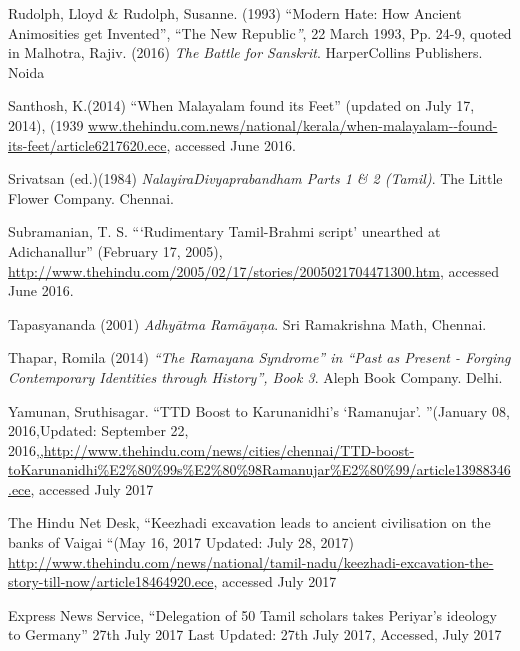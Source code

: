 \begin{thebibliography}{99}
  Rudolph, Lloyd \& Rudolph, Susanne. (1993) “Modern Hate: How Ancient Animosities get Invented”, “The New Republic\textit{”}, 22 March 1993, Pp. 24-9, quoted in Malhotra, Rajiv. (2016) \textit{The Battle for Sanskrit}. HarperCollins Publishers. Noida

  Santhosh, K.(2014) “When Malayalam found its Feet” (updated on July 17, 2014), (1939 \url{www.thehindu.com.news/national/kerala/when-malayalam--found-its-feet/article6217620.ece}, accessed June 2016.

  Srivatsan (ed.)(1984) \textit{NalayiraDivyaprabandham Parts 1 \& 2 (Tamil)}. The Little Flower Company. Chennai.

  Subramanian, T. S. “‘Rudimentary Tamil-Brahmi script' unearthed at Adichanallur” (February 17, 2005), \url{http://www.thehindu.com/2005/02/17/stories/2005021704471300.htm}, accessed June 2016.

  Tapasyananda (2001) \textit{Adhyātma Ramāyaņa}. Sri Ramakrishna Math, Chennai.

  Thapar, Romila (2014) \textit{“The Ramayana Syndrome” in “Past as Present - Forging} \textit{Contemporary Identities through History”, Book 3}. Aleph Book Company. Delhi.

  Yamunan, Sruthisagar. “TTD Boost to Karunanidhi’s ‘Ramanujar’. ”(January 08, 2016,Updated: September 22, 2016,\url{,http://www.thehindu.com/news/cities/chennai/TTD-boost-toKarunanidhi%E2%80%99s%E2%80%98Ramanujar%E2%80%99/article13988346.ece}, accessed July 2017

  The Hindu Net Desk, “Keezhadi excavation leads to ancient civilisation on the banks of Vaigai “(May 16, 2017 Updated: July 28, 2017) \url{http://www.thehindu.com/news/national/tamil-nadu/keezhadi-excavation-the-story-till-now/article18464920.ece}, accessed July 2017

  Express News Service, “Delegation of 50 Tamil scholars takes Periyar’s ideology to Germany” 27th July 2017 Last Updated: 27th July 2017, Accessed, July 2017

 \end{thebibliography}

